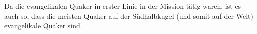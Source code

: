 Da die evangelikalen Quaker in erster Linie in der Mission tätig waren, ist es
auch so, dass die meisten Quaker auf der Südhalbkugel (und somit auf der Welt)
evangelikale Quaker sind.

%
%
%
